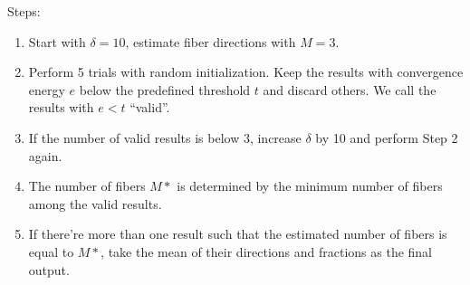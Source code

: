 \documentclass[10pt]{article}
\begin{document}
Steps:

\begin{enumerate}
\item Start with $\delta=10$, estimate fiber directions with $M=3$.
\item Perform 5 trials with random initialization. Keep the results with convergence energy $e$ below the predefined threshold $t$ and discard others. We call the results with $e<t$ ``valid''.
\item If the number of valid results is below 3, increase $\delta$ by 10 and perform Step 2 again.
\item The number of fibers $M*$ is determined by the minimum number of fibers among the valid results. 
\item If there're more than one result such that the estimated number of fibers is equal to $M*$, take the mean of their directions and fractions as the final output.
\end{enumerate}
\end{document}
